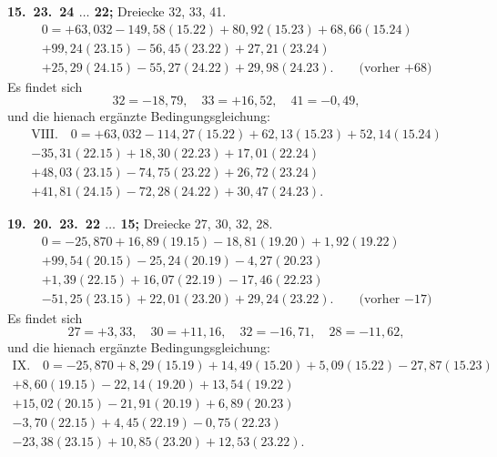 \documentclass[12pt,a4paper]{article}
\theoremstyle{plain}
\theoremstyle{definition}
\theoremstyle{remark}
\begin{document}
\medskip\noindent
\textbf{15.\ 23.\ 24 $\ldots$ 22;} Dreiecke 32, 33, 41.
\begin{multline*}
0 = +63{,}032 - 149{,}58(15.22) + 80{,}92(15.23) + 68{,}66(15.24)\\
+ 99{,}24(23.15) - 56{,}45(23.22) + 27{,}21(23.24)\\
+ 25{,}29(24.15) - 55{,}27(24.22) + 29{,}98(24.23).\qquad\text{(vorher $+68$)}
\end{multline*}
Es findet sich
\[32 = -18{,}79, \quad 33 = +16{,}52, \quad 41 = -0{,}49,\]
und die hienach erg\"anzte Bedingungsgleichung:
\begin{multline*}
\text{VIII.}\quad 0 = +63{,}032 - 114{,}27(15.22) + 62{,}13(15.23) + 52{,}14(15.24)\\
- 35{,}31(22.15) + 18{,}30(22.23) + 17{,}01(22.24)\\
+ 48{,}03(23.15) - 74{,}75(23.22) + 26{,}72(23.24)\\
+ 41{,}81(24.15) - 72{,}28(24.22) + 30{,}47(24.23).
\end{multline*}

\medskip\noindent
\textbf{19.\ 20.\ 23.\ 22 $\ldots$ 15;} Dreiecke 27, 30, 32, 28.
\begin{multline*}
0 = -25{,}870 + 16{,}89(19.15) - 18{,}81(19.20) + 1{,}92(19.22)\\
+ 99{,}54(20.15) - 25{,}24(20.19) - 4{,}27(20.23)\\
+ 1{,}39(22.15) + 16{,}07(22.19) - 17{,}46(22.23)\\
- 51{,}25(23.15) + 22{,}01(23.20) + 29{,}24(23.22).\qquad\text{(vorher $-17$)}
\end{multline*}
Es findet sich
\[27 = +3{,}33, \quad 30 = +11{,}16, \quad 32 = -16{,}71, \quad 28 = -11{,}62,\]
und die hienach erg\"anzte Bedingungsgleichung:
\begin{multline*}
\text{IX.}\quad 0 = -25{,}870 + 8{,}29(15.19) + 14{,}49(15.20) + 5{,}09(15.22) - 27{,}87(15.23)\\
+ 8{,}60(19.15) - 22{,}14(19.20) + 13{,}54(19.22)\\
+ 15{,}02(20.15) - 21{,}91(20.19) + 6{,}89(20.23)\\
- 3{,}70(22.15) + 4{,}45(22.19) - 0{,}75(22.23)\\
- 23{,}38(23.15) + 10{,}85(23.20) + 12{,}53(23.22).
\end{multline*}
\end{document}
